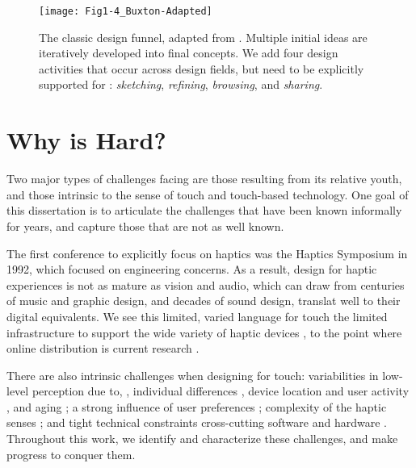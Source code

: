 \begin{figure}[htbp] %
   \centering
   \texttt{[image: Fig1-4\_Buxton-Adapted]} 
   \caption{The classic design funnel, adapted from \citet{Buxton2007}.
   Multiple initial ideas are iteratively developed into final concepts.
   We add four design activities that occur across design fields, but need to be explicitly supported for \haxd: \textit{sketching}, \textit{refining}, \textit{browsing}, and \textit{sharing}.}
   \label{fig:intro:buxtonaugmented}
\end{figure}





\section{Why is \haxd Hard?}
Two major types of challenges facing \haxd are those resulting from its relative youth, and those intrinsic to the sense of touch and touch-based technology.
One goal of this dissertation is to articulate the challenges that have been known informally for years, and capture those that are not as well known.

The first conference to explicitly focus on haptics was the Haptics Symposium in 1992, which focused on engineering concerns.
As a result, design for haptic experiences is not as mature as  vision and audio, which can draw from centuries of music and graphic design, and decades of sound design, translat well to their digital equivalents.
We see this   limited, varied language for touch \cite{Jansson-Boyd2011}  the limited infrastructure to support the wide variety of haptic devices \cite{Hayward2007}, to the point where online distribution is current research \cite{AbdurRahman2010}.

There are also intrinsic challenges when designing for touch:
variabilities in low-level perception due to, \eg, individual differences \cite{Lo1984}, device location and user activity \cite{Karuei2011}, and aging \cite{Stevens1996,Stevens1992};
a strong influence of user preferences \cite{Seifi2014,Seifi2015};
complexity of the haptic senses \cite{ChoiKuchenbecker2013,Lederman2009survey,Kandel2000};
and tight technical constraints cross-cutting software and hardware \cite{levitin2000perception,Hayward2007}.
Throughout this work, we identify and characterize these challenges, and make progress to conquer them.




